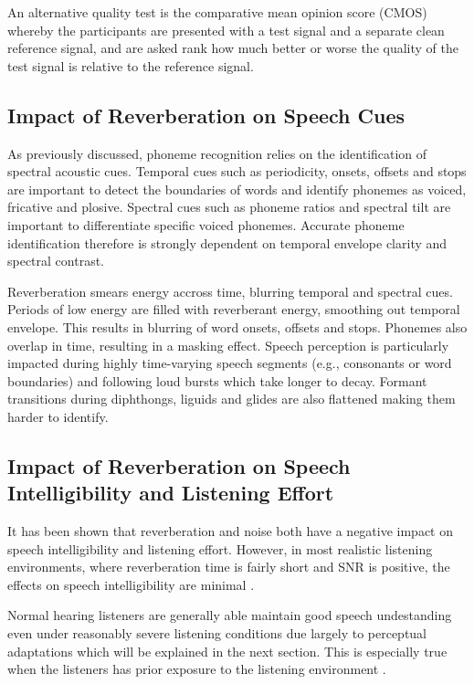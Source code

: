 An alternative quality test is the comparative mean opinion score (CMOS) whereby the participants are presented with a test signal and a separate clean reference signal, and are asked rank how much better or worse the quality of the test signal is relative to the reference signal.

\subsection{Impact of Reverberation on Speech Cues}

As previously discussed, phoneme recognition relies on the identification of spectral acoustic cues. Temporal cues such as periodicity, onsets, offsets and stops are important to detect the boundaries of words and identify phonemes as voiced, fricative and plosive. Spectral cues such as phoneme ratios and spectral tilt are important to differentiate specific voiced phonemes. Accurate phoneme identification therefore is strongly dependent on temporal envelope clarity and spectral contrast.

Reverberation smears energy accross time, blurring temporal and spectral cues. Periods of low energy are filled with reverberant energy, smoothing out temporal envelope. This results in blurring of word onsets, offsets and stops. Phonemes also overlap in time, resulting in a masking effect.  Speech perception is particularly impacted during highly time-varying speech segments (e.g., consonants or word boundaries) and following loud bursts which take longer to decay. Formant transitions during diphthongs, liguids and glides are also flattened making them harder to identify.

\subsection{Impact of Reverberation on Speech Intelligibility and Listening Effort}

It has been shown that reverberation and noise both have a negative impact on speech intelligibility and listening effort. However, in most realistic listening environments, where reverberation time is fairly short and SNR is positive, the effects on speech intelligibility are minimal \citep{schepker2016perceived}. 

Normal hearing listeners are generally able maintain good speech undestanding even under reasonably severe listening conditions \citep{schepker2016perceived} due largely to perceptual adaptations which will be explained in the next section. This is especially true when the listeners has prior exposure to the listening environment \citep{george2010measuring}.

